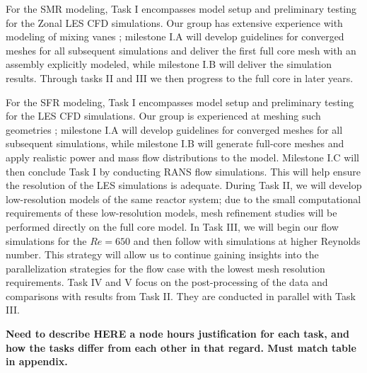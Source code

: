 For the SMR modeling, Task I encompasses model setup and preliminary testing for
the Zonal LES CFD simulations. Our group has extensive experience with modeling of mixing vanes \cite{busco2019invariant}; milestone I.A will develop guidelines for converged meshes for all subsequent simulations and deliver the first full core mesh with an assembly explicitly modeled, while milestone
I.B will deliver the simulation results.  Through tasks II and III we then progress to the full core in later years.

For the SFR modeling, Task I encompasses model setup and preliminary testing for
the LES CFD simulations. Our group is experienced at meshing such geometries \cite{merzari2020toward}; milestone
I.A will develop guidelines for converged meshes for all subsequent simulations, while milestone
I.B will generate full-core meshes and apply realistic power and mass flow distributions to the model.
Milestone I.C will then conclude Task I by conducting RANS flow simulations. This will help ensure the resolution of the LES simulations is adequate.
During Task II, we will develop low-resolution models of the same reactor system;
due to the small computational requirements of these low-resolution models, mesh
refinement studies will be performed directly on the full core model. In Task III, we will begin our flow simulations for the \(Re=650\) and then
follow with simulations at higher Reynolds number. This strategy will allow us to
continue gaining insights into the parallelization strategies for the flow case with the
lowest mesh resolution requirements. Task IV and V focus on the post-processing of the data and comparisons with results from Task II. They are conducted in parallel with Task III.

{\bf Need to describe HERE a node hours justification for each task, and how the tasks differ from each other in that regard. Must match table in appendix.}

